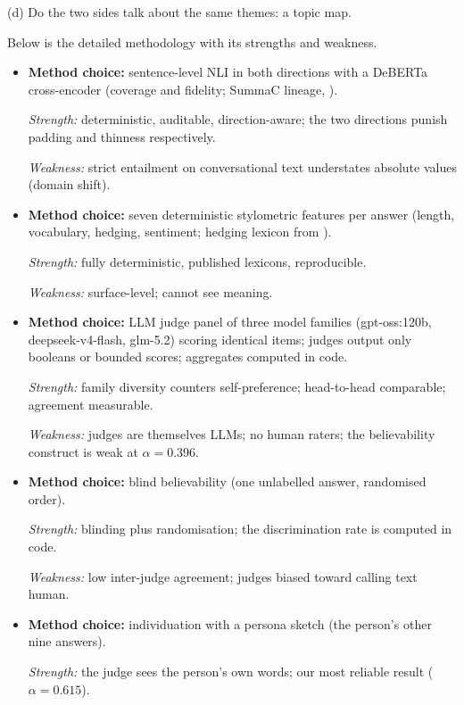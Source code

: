 \documentclass[10pt,twocolumn]{article}
\begin{document}
(d) Do the two sides talk about the same themes: a topic
map. 

Below is the detailed methodology with its strengths and weakness.
\begin{itemize}
\item \textbf{Method choice:} sentence-level NLI in both directions with a
DeBERTa cross-encoder \citep{he2021deberta} (coverage and fidelity; SummaC
lineage, \citealp{laban2022summac}). 

\emph{Strength:} deterministic,
auditable, direction-aware; the two directions punish padding and thinness
respectively. 

\emph{Weakness:} strict entailment on conversational text
understates absolute values (domain shift).

\item \textbf{Method choice:} seven deterministic stylometric features per
answer (length, vocabulary, hedging, sentiment; hedging lexicon from
\citealp{hyland2005metadiscourse}). 

\emph{Strength:} fully deterministic,
published lexicons, reproducible. 

\emph{Weakness:} surface-level; cannot
see meaning.

\item \textbf{Method choice:} LLM judge panel of three model families
(gpt-oss:120b, deepseek-v4-flash, glm-5.2) scoring identical items; judges
output only booleans or bounded scores; aggregates computed in code.

\emph{Strength:} family diversity counters self-preference; head-to-head
comparable; agreement measurable. 

\emph{Weakness:} judges are themselves
LLMs; no human raters; the believability construct is weak at
$\alpha = 0.396$.

\item \textbf{Method choice:} blind believability (one unlabelled answer,
randomised order). 

\emph{Strength:} blinding plus randomisation; the
discrimination rate is computed in code. 

\emph{Weakness:} low inter-judge
agreement; judges biased toward calling text human.

\item \textbf{Method choice:} individuation with a persona sketch (the
person's other nine answers). 

\emph{Strength:} the judge sees the person's
own words; our most reliable result ($\alpha = 0.615$). 


\end{itemize}
\end{document}
